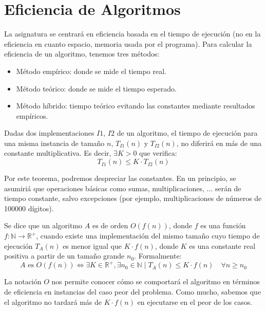 \chapter{Eficiencia de Algoritmos}
La asignatura se centrará en eficiencia basada en el tiempo de ejecución (no en la eficiencia en cuanto espacio, memoria usada por el programa).
Para calcular la eficiencia de un algoritmo, tenemos tres métodos:
\begin{itemize}
    \item Método empírico: donde se mide el tiempo real.
    \item Método teórico: donde se mide el tiempo esperado.
    \item Método híbrido: tiempo teórico evitando las constantes mediante resultados empíricos.
\end{itemize}

\begin{prop}
Dadas dos implementaciones $I1$, $I2$ de un algoritmo, el tiempo de ejecución para una misma instancia de tamaño $n$, $T_{I1}(n)$ y $T_{I2}(n)$, no diferirá en más de una constante multiplicativa. Es decir, $\exists K > 0$ que verifica: 
\begin{equation*}
T_{I1}(n) \leq K \cdot T_{I2}(n)
\end{equation*}

\end{prop}
Por este teorema, podremos despreciar las constantes.
En un principio, se asumiriá que operaciones básicas como sumas, multiplicaciones, $\ldots$ serán de tiempo constante, salvo excepciones (por ejemplo, multiplicaciones de números de 100000 dígitos).

\begin{definicion}[Notación O]
Se dice que un algoritmo $A$ es de orden $O(f(n))$, donde $f$ es una función $f:\mathbb{N}\rightarrow \mathbb{R}^{+}$, cuando existe una implementación del mismo tamaño cuyo tiempo de ejecución $T_A(n)$ es menor igual que $K \cdot f(n)$, donde $K$ es una constante real positiva a partir de un tamaño grande $n_0$. Formalmente:
\begin{equation*}
A \text{\ es\ } O(f(n)) \Longleftrightarrow \exists K \in \mathbb{R}^{+}, \exists n_0 \in \mathbb{N} \mid T_A(n) \leq K \cdot f(n)\quad\forall n \geq n_0
\end{equation*}
\end{definicion}
La notación $O$ nos permite conocer cómo se comportará el algoritmo en términos de eficiencia en instancias del caso peor del problema. Como mucho, sabemos que el algoritmo no tardará más de $K \cdot f(n)$ en ejecutarse en el peor de los casos.

